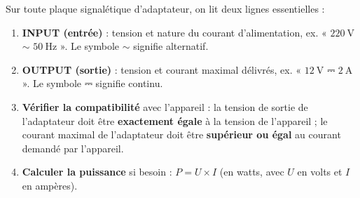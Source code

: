 \documentclass[11pt]{article}
\newcommand{\cle}[1]{{\popxbold\color{popdark}#1}}
\begin{document}
\begin{methode}
Sur toute plaque signalétique d'adaptateur, on lit deux lignes essentielles :
\begin{enumerate}
\item \textbf{INPUT (entrée)} : tension et nature du courant d'alimentation, ex. « $220\ \text{V}$ $\sim$ $50\ \text{Hz}$ ». Le symbole $\sim$ signifie \cle{alternatif}.
\item \textbf{OUTPUT (sortie)} : tension et courant maximal délivrés, ex. « $12\ \text{V}$ ⎓ $2\ \text{A}$ ». Le symbole ⎓ signifie \cle{continu}.
\item \textbf{Vérifier la compatibilité} avec l'appareil : la tension de sortie de l'adaptateur doit être \textbf{exactement égale} à la tension de l'appareil ; le courant maximal de l'adaptateur doit être \textbf{supérieur ou égal} au courant demandé par l'appareil.
\item \textbf{Calculer la puissance} si besoin : $P = U \times I$ (en watts, avec $U$ en volts et $I$ en ampères).
\end{enumerate}
\end{methode}
\end{document}
